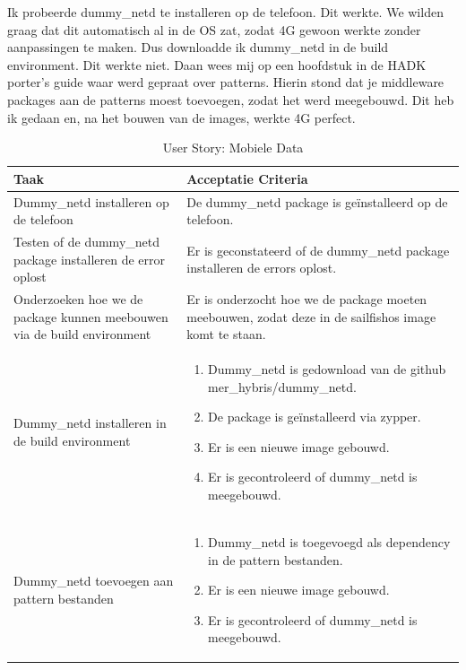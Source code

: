 \documentclass[a4paper]{report}
\newcommand{\userstorycolor}{PeachPuff1}
\begin{document}
\begin{tcolorbox}[colback=white, coltitle=black, colframe=\userstorycolor, title=\textbf{User Story: }Als gebruiker wil ik graag met de Fairphone mobiele data kunnen gebruiken\, zodat ik ook onderweg internet kan gebruiken.]
  \par\smallskip 
    Ik probeerde dummy\_netd te installeren op de telefoon. Dit werkte. We wilden graag dat dit automatisch al in de OS zat, zodat 4G gewoon werkte zonder aanpassingen te maken.
    Dus downloadde ik dummy\_netd in de build environment. Dit werkte niet. 
    Daan wees mij op een hoofdstuk in de HADK porter's guide waar werd gepraat over patterns.
    Hierin stond dat je middleware packages aan de patterns moest toevoegen, zodat het werd meegebouwd.
    Dit heb ik gedaan en, na het bouwen van de images, werkte 4G perfect.

  \begin{table}[H]
      \centering
    \begin{tabularx}{1\textwidth}{|X|X|}
      \hline
      \cellcolor[HTML]{ffcc99} \textbf{Taak} & \cellcolor[HTML]{ffcc99} \textbf{Acceptatie Criteria} \\ 
      \hline
      Dummy\_netd installeren op de telefoon & De dummy\_netd package is geïnstalleerd op de telefoon. \\
      \hline 
      Testen of de dummy\_netd package installeren de error oplost & Er is geconstateerd of de dummy\_netd package installeren de errors oplost. \\
      \hline 
      Onderzoeken hoe we de package kunnen meebouwen via de build environment & Er is onderzocht hoe we de package moeten meebouwen, zodat deze in de sailfishos image komt te staan. \\ 
      \hline 
      Dummy\_netd installeren in de build environment & 
      \begin{enumerate}[leftmargin=.4cm, topsep=0cm, itemsep=.2cm]
        \item Dummy\_netd is gedownload van de github mer\_hybris/dummy\_netd.
        \item De package is geïnstalleerd via zypper.
        \item Er is een nieuwe image gebouwd.
        \item Er is gecontroleerd of dummy\_netd is meegebouwd.
      \end{enumerate} \\
      \hline
      Dummy\_netd toevoegen aan pattern bestanden & 
      \begin{enumerate}[leftmargin=.4cm, topsep=0cm, itemsep=.2cm]
        \item Dummy\_netd is toegevoegd als dependency in de pattern bestanden.
        \item Er is een nieuwe image gebouwd.
        \item Er is gecontroleerd of dummy\_netd is meegebouwd.
      \end{enumerate} \\
      \hline
    \end{tabularx}
    \caption{User Story: Mobiele Data}
  \label{table:it4:story_mobiledata}
  \end{table}
  \end{tcolorbox}
\end{document}
